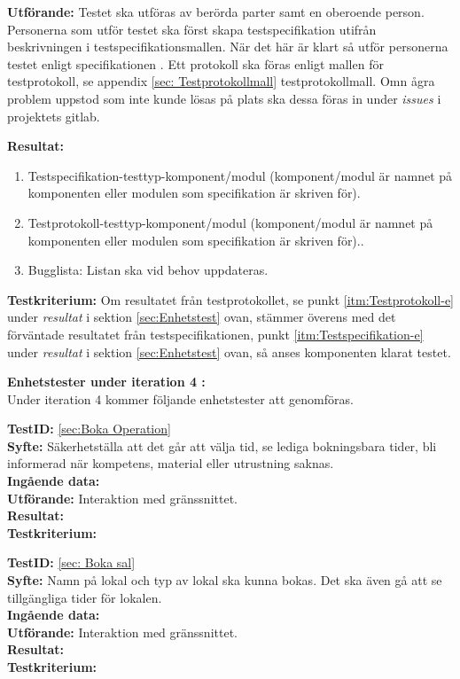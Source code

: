\documentclass[a4paper,10pt]{article}
\begin{document}
  \textbf{Utförande:} Testet ska utföras av berörda parter samt en oberoende
   person. Personerna som utför testet ska först skapa testspecifikation utifrån beskrivningen i testspecifikationsmallen. När det här är klart så utför
   personerna testet enligt specifikationen \cite{kravspec}. Ett protokoll ska föras enligt mallen för testprotokoll, se appendix \ref{sec:       		 
   Testprotokollmall} testprotokollmall. Omn ågra problem uppstod som inte kunde lösas på plats ska dessa föras in under \emph{issues} i projektets gitlab.

  \textbf{Resultat:}
    \begin{enumerate}
      \item \label{itm:Testspecifikation-e} Testspecifikation-testtyp-komponent/modul (komponent/modul är namnet på komponenten eller modulen som 				   specifikation är skriven för).
      \item \label{itm:Testprotokoll-e} Testprotokoll-testtyp-komponent/modul (komponent/modul är namnet på komponenten eller modulen som specifikation
       är skriven för)..
      \item Bugglista: Listan ska vid behov uppdateras.
    \end{enumerate}

  \textbf{Testkriterium:} Om resultatet från testprotokollet, se punkt \ref{itm:Testprotokoll-e} under \emph{resultat} i sektion \ref{sec:Enhetstest}
   ovan, stämmer överens med det förväntade resultatet från testspecifikationen, punkt \ref{itm:Testspecifikation-e} under \emph{resultat} i sektion
  \ref{sec:Enhetstest} ovan, så anses komponenten klarat testet.
  
  \textbf{Enhetstester under iteration 4 :}
  \\  Under iteration 4 kommer följande enhetstester att genomföras.
  
  \textbf{TestID:} \ref{sec:Boka Operation}
  \\ \textbf{Syfte:} Säkerhetställa att det går att välja tid, se lediga bokningsbara tider, bli informerad när kompetens, material eller utrustning saknas.
  \\ \textbf{Ingående data:}  
  \\ \textbf{Utförande:} Interaktion med gränssnittet. 
  \\ \textbf{Resultat:}	
  \\ \textbf{Testkriterium:}
  
  \textbf{TestID:} \ref{sec: Boka sal}
  \\ \textbf{Syfte:} Namn på lokal och typ av lokal ska kunna bokas. Det ska även gå att se tillgängliga tider för lokalen.
  \\ \textbf{Ingående data:}   
  \\ \textbf{Utförande:} Interaktion med gränssnittet.
  \\ \textbf{Resultat:}	
  \\ \textbf{Testkriterium:} 
  
\end{document}
